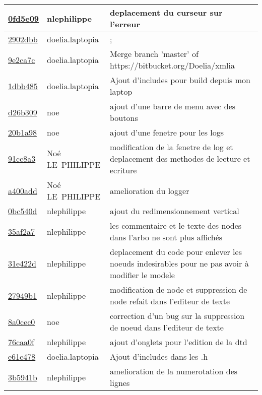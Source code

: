 \begin{tabular}{l l l}
\href{0fd5e096ebf9f271aea0e39cd7eb794b0b450013}{0fd5e09} & nlephilippe & deplacement du curseur sur l'erreur\\\hline
\href{2902dbbbcbc63b75e6209ca2ec5dbdf8af68fe55}{2902dbb} & doelia.laptopia & ;\\\hline
\href{9e2ca7c7b4cc6d8e39ce18ada4b03d39b2a92657}{9e2ca7c} & doelia.laptopia & Merge branch 'master' of https://bitbucket.org/Doelia/xmlia\\\hline
\href{1dbb4854249659515faecd0801b49997d1e12e06}{1dbb485} & doelia.laptopia & Ajout d'includes pour build depuis mon laptop\\\hline
\href{d26b309c151ac19abf9ef277dc042eb9bee5913c}{d26b309} & noe & ajout d'une barre de menu avec des boutons\\\hline
\href{20b1a986c3f05e3f70ba635577c5d0cdc900dc3a}{20b1a98} & noe & ajout d'une fenetre pour les logs\\\hline
\href{91cc8a3640ff0f70b61f4bd3a6cff11530006b6f}{91cc8a3} & Noé LE PHILIPPE & modification de la fenetre de log et deplacement des methodes de lecture et ecriture\\\hline
\href{a400add8f436ab79c93702b0092abf8d1bee1264}{a400add} & Noé LE PHILIPPE & amelioration du logger\\\hline
\href{0bc540dae7bc08a6cc64945a95d333827e0aded0}{0bc540d} & nlephilippe & ajout du redimensionnement vertical\\\hline
\href{35af2a7805fcded7340e9fcde4c71d483cd7de25}{35af2a7} & nlephilippe & les commentaire et le texte des nodes dans l'arbo ne sont plus affichés\\\hline
\href{31e422dad37e9dd4aafd54afbd83964eb1a99727}{31e422d} & nlephilippe & deplacement du code pour enlever les noeuds indesirables pour ne pas avoir à modifier le modele\\\hline
\href{27949b1475ebaa258986b5eb2a0c326ff0d937c8}{27949b1} & nlephilippe & modification de node et suppression de node refait dans l'editeur de texte\\\hline
\href{8a0cec00f0ca93e2556767fbf7dd4024bef64345}{8a0cec0} & noe & correction d'un bug sur la suppression de noeud dans l'editeur de texte\\\hline
\href{76caa0f311e2a2559bca52ef6344fe96b1c7e12b}{76caa0f} & nlephilippe & ajout d'onglets pour l'edition de la dtd\\\hline
\href{e61c478fbab1e37d1b7b6c2b3a0148651975aff9}{e61c478} & doelia.laptopia & Ajout d'includes dans les .h\\\hline
\href{3b5941b8feeb47244baf590438973ca6fff4e7c8}{3b5941b} & nlephilippe & amelioration de la numerotation des lignes\\\hline

\end{tabular}
